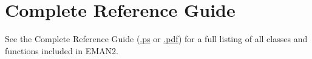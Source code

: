 \section{Complete Reference Guide}
  \label{Complete-Reference-Guide}

See the Complete Reference Guide
(\href{Complete-Ref-Guide.ps}{.ps} or
\href{Complete-Ref-Guide.pdf}{.pdf}) for a full listing of all
classes and functions included in EMAN2.